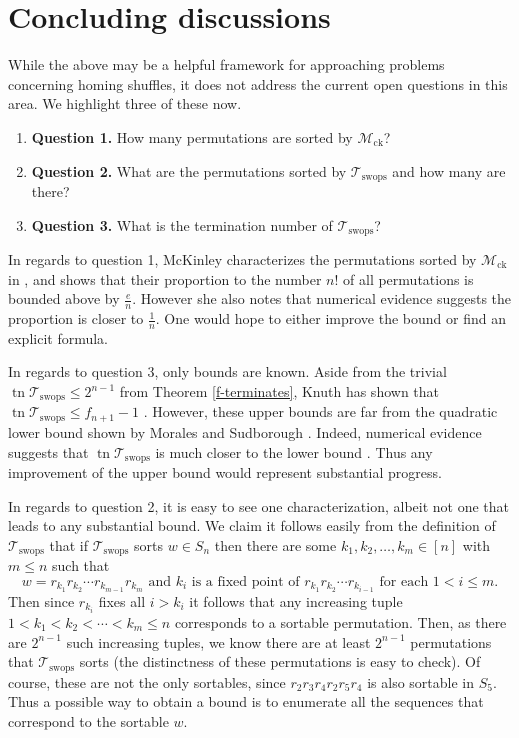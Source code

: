 \documentclass[final,nomarks]{dmtcs-episciences}
\theoremstyle{definition}
\theoremstyle{definition}
\theoremstyle{remark}
\newcommand{\mck}{\mathcal{M}_{\text{ck}}} %
\newcommand{\Ts}{\mathcal{T}_{\text{swops}}} %
\newcommand{\tn}{\operatorname{tn }} %
\begin{document}
\section{Concluding discussions}

While the above may be a helpful framework for approaching problems concerning homing shuffles, it does not address the current open questions in this area. We highlight three of these now.

\begin{enumerate}[]
    \item\textbf{Question 1.} How many permutations are sorted by $\mck$?
    \item\textbf{Question 2.} What are the permutations sorted by $\Ts$ and how many are there?
    \item\textbf{Question 3.} What is the termination number of $\Ts$?
\end{enumerate}

In regards to question 1, McKinley characterizes the permutations sorted by $\mck$ in \cite{McK2015}, and shows that their proportion to the number $n!$ of all permutations is bounded above by $\frac{e}{n}$. However she also notes that numerical evidence suggests the proportion is closer to $\frac{1}{n}$. One would hope to either improve the bound or find an explicit formula.

In regards to question 3, only bounds are known. Aside from the trivial $\tn \Ts \le 2^{n-1}$ from Theorem \ref{f-terminates}, Knuth has shown that $\tn \Ts \le f_{n+1} - 1$ \cite{TAoCP4A}. However, these upper bounds are far from the quadratic lower bound shown by Morales and Sudborough \cite{morales2010}. Indeed, numerical evidence suggests that $\tn \Ts$ is much closer to the lower bound \cite{OEIS_TS}. Thus any improvement of the upper bound would represent substantial progress.

In regards to question 2, it is easy to see one characterization, albeit not one that leads to any substantial bound. We claim it follows easily from the definition of $\Ts$ that if $\Ts$ sorts $w \in S_n$ then there are some $k_1,k_2,\dots,k_m \in [n]$ with $m \le n$ such that
\[
w = r_{k_{1}}r_{k_{2}} \cdots r_{k_{m-1}}r_{k_{m}} \text{ and } k_i \text{ is a fixed point of } r_{k_{1}}r_{k_{2}} \cdots r_{k_{i-1}} \text{ for each } 1 < i \le m.
\]
Then since $r_{k_i}$ fixes all $i > k_i$ it follows that any increasing tuple $1 < k_1 < k_2 < \cdots < k_m \le n$ corresponds to a sortable permutation.
Then, as there are $2^{n-1}$ such increasing tuples, we know there are at least $2^{n-1}$ permutations that $\Ts$ sorts (the distinctness of these permutations is easy to check).
Of course, these are not the only sortables, since $r_{2}r_{3}{r_{4}}r_{2}r_{5}r_{4}$ is also sortable in $S_5$. Thus a possible way to obtain a bound is to enumerate all the sequences that correspond to the sortable $w$.
\end{document}
